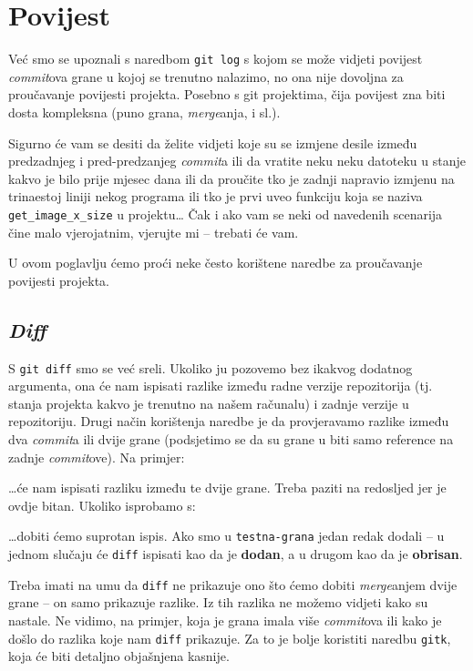 \chapter*{Povijest}

Već smo se upoznali s naredbom \verb+git log+ s kojom se može vidjeti povijest \emph{commit}ova grane u kojoj se trenutno nalazimo, no ona nije dovoljna za proučavanje povijesti projekta.
Posebno s git projektima, čija povijest zna biti dosta kompleksna (puno grana, \emph{merge}anja, i sl.).

Sigurno će vam se desiti da želite vidjeti koje su se izmjene desile između predzadnjeg i pred-predzanjeg \emph{commit}a ili da vratite neku neku datoteku u stanje kakvo je bilo prije mjesec dana ili da proučite tko je zadnji napravio izmjenu na trinaestoj liniji nekog programa ili tko je prvi uveo funkciju koja se naziva \verb+get_image_x_size+ u projektu\dots 
Čak i ako vam se neki od navedenih scenarija čine malo vjerojatnim, vjerujte mi -- trebati će vam.

U ovom poglavlju ćemo proći neke često korištene naredbe za proučavanje povijesti projekta.

\section*{\emph{Diff}}

S \verb+git diff+ smo se već sreli. 
Ukoliko ju pozovemo bez ikakvog dodatnog argumenta, ona će nam ispisati razlike između radne verzije repozitorija (tj. stanja projekta kakvo je trenutno na našem računalu) i zadnje verzije u repozitoriju.
Drugi način korištenja naredbe je da provjeravamo razlike između dva \emph{commit}a ili dvije grane (podsjetimo se da su grane u biti samo reference na zadnje \emph{commit}ove).
Na primjer:


\dots{}će nam ispisati razliku između te dvije grane. 
Treba paziti na redosljed jer je ovdje bitan.
Ukoliko isprobamo s:


\dots{}dobiti ćemo suprotan ispis. 
Ako smo u \verb+testna-grana+ jedan redak dodali -- u jednom slučaju će \verb+diff+ ispisati kao da je \textbf{dodan}, a u drugom kao da je \textbf{obrisan}.

Treba imati na umu da \verb+diff+ ne prikazuje ono što ćemo dobiti \emph{merge}anjem dvije grane -- on samo prikazuje razlike.
Iz tih razlika ne možemo vidjeti kako su nastale.
Ne vidimo, na primjer, koja je grana imala više \emph{commit}ova ili kako je došlo do razlika koje nam \verb+diff+ prikazuje.
Za to je bolje koristiti naredbu \verb+gitk+, koja će biti detaljno objašnjena kasnije.

